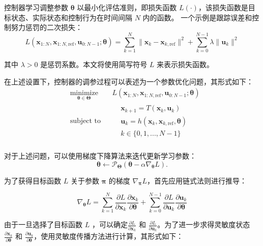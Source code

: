 \documentclass[lang=chs, degree=master, blindreview=true, winfonts=true]{yanputhesis}
\begin{document}
控制器学习调整参数 \( \bm \theta \) 以最小化评估准则，即损失函数 \( L(\cdot) \)，该损失函数是目标状态、实际状态和控制行为在时间间隔 \( N \) 内的函数。  
一个示例是跟踪误差和控制努力惩罚的二次损失：
\begin{equation}
	L(\bm x_{1:N}, \bm x_{{1:N},\text{ref}}, \bm u_{0:N-1}; \bm \theta) = \sum_{k=1}^{N} \| \bm x_k - \bm {x}_{k,\text{ref}} \|^2 + \sum_{k=0}^{N-1} \lambda \| \bm u_k \|^2
	\label{3}
\end{equation}

其中 \( \lambda > 0 \) 是惩罚系数。本文将使用简写符号 \( L \) 来表示损失函数。

在上述设置下，控制器的调参过程可以表述为一个参数优化问题，其形式如下：
\begin{equation}
	\label{5}
	\begin{aligned} 
		&\operatorname*{minimize}_{\bm \theta \in \bm \Theta} & & L(\bm x_{1:N}, \bm x_{{1:N},\text{ref}}, \bm u_{0:N-1}; \bm \theta) \\
		&\text{subject to} & & \begin{aligned}
			&\boldsymbol{x}_{{k+1}} = {{T}}\left(\boldsymbol{x}_{k}, \boldsymbol{u}_{{k}}\right) \\
			&\bm u_k = h(\bm x_k, \bm x_{k,\text{ref}}, \bm \theta)\\& k \in \{0,1,...,N-1 \}
		\end{aligned} \\
	\end{aligned}
\end{equation}

对于上述问题，可以使用梯度下降算法来迭代更新学习参数：
\begin{equation}
    \bm \theta\leftarrow\mathcal{P}_{\bm \Theta}(\bm \theta-\alpha\nabla_{\bm \theta}L).
\end{equation}

为了获得目标函数 $L$ 关于参数 $\bm \pi$ 的梯度 $\nabla_{\bm \pi} L$，首先应用链式法则进行推导：

\begin{equation}
    \nabla_{\bm \theta} L = \sum_{k=1}^{N} \frac{\partial L}{\partial \bm x_k} \frac{\partial \bm x_k}{\partial \bm \theta} + \sum_{k=0}^{N-1} \frac{\partial L}{\partial \bm u_k} \frac{\partial \bm u_k}{\partial \bm \theta}
\end{equation}

由于一旦选择了目标函数 
$L$ ，可以确定$\frac{\partial L}{\partial \bm x_k}$ 和 $\frac{\partial L}{\partial \bm u_k}$。为了进一步求得灵敏度状态 $\frac{\partial \bm x_k}{\partial \bm \theta}$ 和 $\frac{\partial \bm u_k}{\partial \bm \theta}$，使用灵敏度传播方法进行计算，其形式如下：
\end{document}
